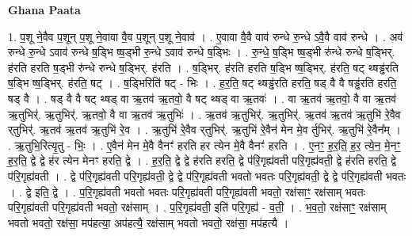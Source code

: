 \documentclass[17pt]{extarticle}
\begin{document}
\textbf{Ghana Paata } \newline

1. प॒शू ने॒वैव प॒शून् प॒शू ने॒वावा वै॒व प॒शून् प॒शू ने॒वाव॑ । . ए॒वावा वै॒वै वाव॑ रुन्धे रु॒न्धे ऽवै॒वै वाव॑ रुन्धे । . अव॑ रुन्धे रु॒न्धे ऽवाव॑ रुन्धे ष॒ड्भि ष्ष॒ड्भी रु॒न्धे ऽवाव॑ रुन्धे ष॒ड्भिः । . रु॒न्धे॒ ष॒ड्भि ष्ष॒ड्भी रु॑न्धे रुन्धे ष॒ड्भिर्. ह॑रति हरति ष॒ड्भी रु॑न्धे रुन्धे ष॒ड्भिर्. ह॑रति । . ष॒ड्भिर्. ह॑रति हरति ष॒ड्भि ष्ष॒ड्भिर्. ह॑रति॒ षट् थ्षड्ढ॑रति ष॒ड्भि ष्ष॒ड्भिर्. ह॑रति॒ षट् । . ष॒ड्भिरिति॑ षट् - भिः । . ह॒र॒ति॒ षट् थ्षड्ढ॑रति हरति॒ षड् वै वै षड्ढ॑रति हरति॒ षड् वै । . षड् वै वै षट् थ्षड् वा ऋ॒तव॑ ऋ॒तवो॒ वै षट् थ्षड् वा ऋ॒तवः॑ । . वा ऋ॒तव॑ ऋ॒तवो॒ वै वा ऋ॒तव॑ ऋ॒तुभिर्॑. ऋ॒तुभिर्॑. ऋ॒तवो॒ वै वा ऋ॒तव॑ ऋ॒तुभिः॑ । . ऋ॒तव॑ ऋ॒तुभिर्॑. ऋ॒तुभिर्॑. ऋ॒तव॑ ऋ॒तव॑ ऋ॒तुभि॑ रे॒वैव र्‌तुभिर्॑. ऋ॒तव॑ ऋ॒तव॑ ऋ॒तुभि॑ रे॒व । . ऋ॒तुभि॑ रे॒वैव र्‌तुभिर्॑. ऋ॒तुभि॑ रे॒वैन॑ मेन मे॒व र्तुभिर्॑. ऋ॒तुभि॑ रे॒वैन᳚म् । . ऋ॒तुभि॒रित्यृ॒तु - भिः॒ । . ए॒वैन॑ मेन मे॒वै वैनꣳ॑ हरति हर त्येन मे॒वै वैनꣳ॑ हरति । . ए॒नꣳ॒॒ ह॒र॒ति॒ ह॒र॒ त्ये॒न॒ मे॒नꣳ॒॒ ह॒र॒ति॒ द्वे द्वे ह॑र त्येन मेनꣳ हरति॒ द्वे । . ह॒र॒ति॒ द्वे द्वे ह॑रति हरति॒ द्वे प॑रि॒गृह्य॑वती परि॒गृह्य॑वती॒ द्वे ह॑रति हरति॒ द्वे प॑रि॒गृह्य॑वती । . द्वे प॑रि॒गृह्य॑वती परि॒गृह्य॑वती॒ द्वे द्वे प॑रि॒गृह्य॑वती भवतो भवतः परि॒गृह्य॑वती॒ द्वे द्वे प॑रि॒गृह्य॑वती भवतः । . द्वे इति॒ द्वे । . प॒रि॒गृह्य॑वती भवतो भवतः परि॒गृह्य॑वती परि॒गृह्य॑वती भवतो॒ रक्ष॑साꣳ॒॒ रक्ष॑साम् भवतः परि॒गृह्य॑वती परि॒गृह्य॑वती भवतो॒ रक्ष॑साम् । . प॒रि॒गृह्य॑वती॒ इति॑ परि॒गृह्य॑ - व॒ती॒ । . भ॒व॒तो॒ रक्ष॑साꣳ॒॒ रक्ष॑साम् भवतो भवतो॒ रक्ष॑सा॒ मप॑हत्या॒ अप॑हत्यै॒ रक्ष॑साम् भवतो भवतो॒ रक्ष॑सा॒ मप॑हत्यै । \newline
\end{document}
